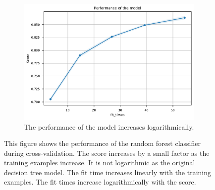 \documentclass{l4proj}
\begin{document}
\begin{appendices}
\begin{figure}[htbp]
\begin{subfigure}[b]{0.70\textwidth}
        \includegraphics[width=\textwidth]{images/sessions/learning_curve_3_EnsembleRandomForestSessions}
        \caption{The performance of the model increases logarithmically.}
        \label{fig:learning_curve_3_EnsembleRandomForestSessions}
    \end{subfigure}
    \caption{This figure shows the performance of the random forest classifier during cross-validation. The score increases by a small factor as the training examples increase. It is not logarithmic as the original decision tree model. The fit time increases linearly with the training examples. The fit times increase logarithmically with the score.}\label{fig:session_random_forest_learning_curve}
\end{figure}


\end{appendices}
\end{document}

